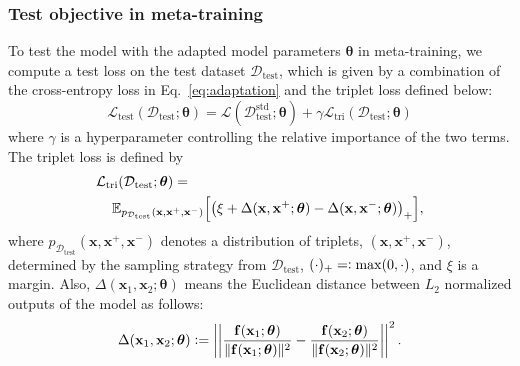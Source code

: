 \documentclass[letterpaper]{article} %
\newcommand{\defeq}{\vcentcolon=}
\newcommand{\eqdef}{=\vcentcolon}
\def \x{\mathbf{x}}
\def \f{\mathbf{f}}
\def \dataval{\mathcal{D}_\text{test}}
\def \thetageneral{\boldsymbol{\theta}}
\def \lossval{\mathcal{L}_\text{test}}
\def \losstriple{\mathcal{L}_\text{tri}}
\begin{document}
\subsubsection{Test objective in meta-training}

To test the model with the adapted model parameters $\thetageneral$ in meta-training, we compute a test loss on the test dataset $\dataval$, which is given by a combination of the cross-entropy loss in Eq.~\eqref{eq:adaptation} and the triplet loss defined below:
%
\begin{equation}
\lossval(\dataval;\thetageneral) = \mathcal{L}(\dataval^\text{std};\thetageneral) +\gamma \losstriple(\dataval;\thetageneral)
\end{equation}
%
where $\gamma$ is a hyperparameter controlling the relative importance of the two terms.
The triplet loss is defined by
%
\begin{align}
&\losstriple (\dataval; \thetageneral)= \\
&\hspace{0.4cm}\mathbb{E}_{p_{\dataval}(\x, \x^{+}, \x^{-})}\Big[ \big(\xi + \Delta(\x, \x^{+}; \thetageneral) - \Delta(\x, \x^{-}; \thetageneral)\big)_+ \Big], \nonumber
\end{align}
%
where $p_{\dataval}(\x, \x^+, \x^-)$ denotes a distribution of triplets, $(\x, \x^+, \x^-)$, determined by the sampling strategy from  $\dataval$, $(\cdot)_+ \eqdef \max(0, \cdot)$, and $\xi$ is a margin. 
Also, $\Delta(\x_1, \x_2; \thetageneral)$ means the Euclidean distance between $L_2$ normalized outputs of the model as follows:
%
\begin{align}
\Delta(\x_1, \x_2; \thetageneral) \defeq \left|\left| \frac{\f(\x_1 ;\thetageneral)}{\|\f(\x_1;\thetageneral) \|^2} - \frac{\f(\x_2;\thetageneral)}{\|\f(\x_2;\thetageneral)\|^2} \right|\right|^2.
\end{align}
%
\end{document}
